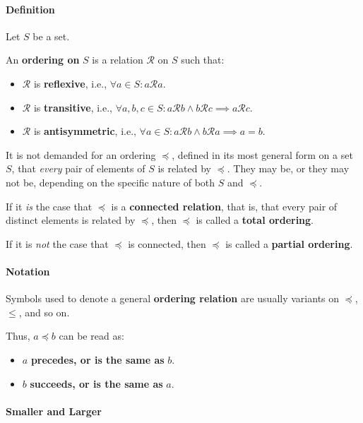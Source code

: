 \paragraph{Definition}

Let $S$ be a set.

An \textbf{ordering on} $S$ is a relation $\mathcal{R}$ on $S$ such
that:

\begin{itemize}
\item $\mathcal{R}$ is \textbf{reflexive}, i.e., $\forall a \in S: a \mathcal{R} a$.
\item $\mathcal{R}$ is \textbf{transitive}, i.e.,
  $\forall a, b, c \in S: a \mathcal{R} b \land b \mathcal{R} c
  \implies a \mathcal{R} c$.
\item $\mathcal{R}$ is \textbf{antisymmetric}, i.e.,
  $\forall a \in S : a \mathcal{R} b \land b \mathcal{R} a \implies a
  = b$.
\end{itemize}

It is not demanded for an ordering $\preceq$, defined in its most
general form on a set $S$, that \textit{every} pair of elements of $S$
is related by $\preceq$. They may be, or they may not be, depending on
the specific nature of both $S$ and $\preceq$.

If it \textit{is} the case that $\preceq$ is a \textbf{connected
  relation}, that is, that every pair of distinct elements is related
by $\preceq$, then $\preceq$ is called a \textbf{total ordering}.

If it is \textit{not} the case that $\preceq$ is connected, then
$\preceq$ is called a \textbf{partial ordering}.


\paragraph{Notation}

Symbols used to denote a general \textbf{ordering relation} are
usually variants on $\preceq$, $\leq$, and so on.

Thus, $a \preceq b$ can be read as:
\begin{itemize}
\item $a$ \textbf{precedes, or is the same as} $b$.
\item $b$ \textbf{succeeds, or is the same as} $a$.
\end{itemize}

\paragraph{Smaller and Larger}

